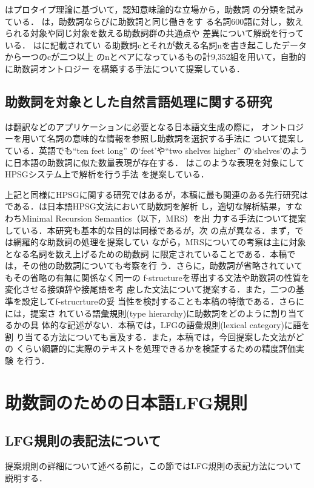 \documentclass[japanese]{jnlp_1.4}
\begin{document}
\cite{Yo93}はプロタイプ理論に基づいて，認知意味論的な立場から，助数詞
の分類を試みている． \cite{Iida}は，助数詞ならびに助数詞と同じ働きをす
る名詞600語に対し，数えられる対象や同じ対象を数える助数詞群の共通点や
差異について解説を行っている． \cite{Sirai}は\cite{Iida}に記載されてい
る助数詞cとそれが数える名詞nを書き起こしたデータから一つのcが二つ以上
のnとペアになっているもの計9,352組を用いて，自動的に助数詞オントロジー
を構築する手法について提案している．

\subsection{助数詞を対象とした自然言語処理に関する研究}

 \cite{Bond}は翻訳などのアプリケーションに必要となる日本語文生成の際に，
 オントロジーを用いて名詞の意味的な情報を参照し助数詞を選択する手法に
 ついて提案している．英語でも``ten feet long'' の`feet'や``two shelves
 higher'' の`shelves'のように日本語の助数詞に似た数量表現が存在する．
 \cite{Dan}はこのような表現を対象にしてHPSGシステム上で解析を行う手法
 を提案している．

上記と同様にHPSGに関する研究ではあるが，本稿に最も関連のある先行研究は
\cite{Bender}である．\cite{Bender}は日本語HPSG文法において助数詞を解析
し，適切な解析結果，すなわちMinimal Recursion Semantics（以下，MRS）を出
力する手法について提案している．本研究も基本的な目的は同様であるが，次
の点が異なる．まず，\cite{Bender}では網羅的な助数詞の処理を提案してい
ながら，MRSについての考察は主に対象となる名詞を数え上げるための助数詞
に限定されていることである．本稿では，その他の助数詞についても考察を行
う．さらに，助数詞が省略されていてもその省略の有無に関係なく同一の
f-structureを導出する文法や助数詞の性質を変化させる接頭辞や接尾語を考
慮した文法について提案する．また，二つの基準を設定してf-strucrtureの妥
当性を検討することも本稿の特徴である．さらに\cite{Bender}には，提案さ
れている語彙規則(type hierarchy)に助数詞をどのように割り当てるかの具
体的な記述がない．本稿では，LFGの語彙規則(lexical category)に語を割
り当てる方法についても言及する．また，本稿では，今回提案した文法がどの
くらい網羅的に実際のテキストを処理できるかを検証するための精度評価実験
を行う．


\section{\label{rule}助数詞のための日本語LFG規則}

\subsection{\label{rule-intro}LFG規則の表記法について}
提案規則の詳細について述べる前に，この節ではLFG規則の表記方法について
説明する．
\end{document}
